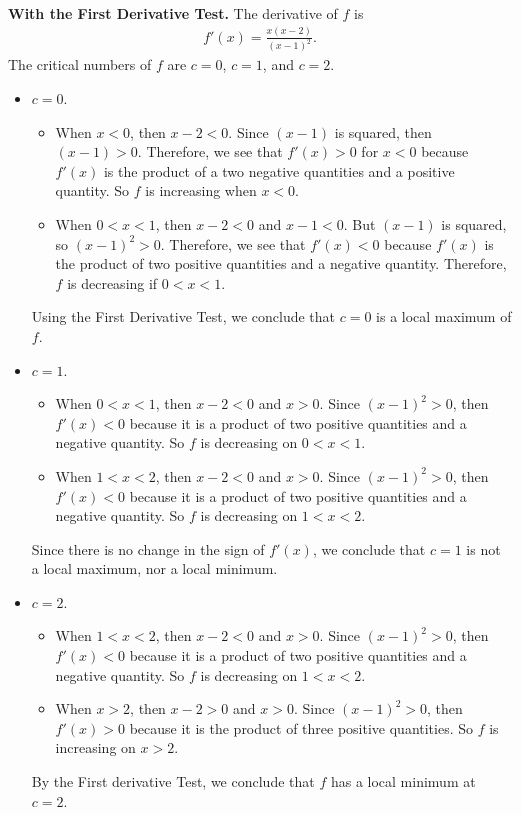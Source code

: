 	\spc
	
	\\
	\textbf{With the First Derivative Test.} The derivative of $f$ is
		\begin{align*}
		f'(x) = \frac{x(x - 2)}{(x - 1)^2} .
		\end{align*}
	The critical numbers of $f$ are $c = 0$, $c = 1$, and $ c= 2$.
	
		\begin{itemize}
		\item $c = 0$. 
			\begin{itemize}
			\item When $x < 0$, then $x - 2 < 0$. Since $(x - 1)$ is squared, then $(x - 1) > 0$. Therefore, we see that $f'(x) > 0$ for $x < 0$ because $f'(x)$ is the product of a two negative quantities and a positive quantity. So $f$ is increasing when $x < 0$.
			\item When $0 < x < 1$, then $x - 2 < 0$ and $x - 1 < 0$. But $(x - 1)$ is squared, so $(x- 1)^2 > 0$. Therefore, we see that $f'(x) < 0$ because $f'(x)$ is the product of two positive quantities and a negative quantity. Therefore, $f$ is decreasing if $0 < x < 1$. 
			\end{itemize}
		Using the First Derivative Test, we conclude that $c = 0$ is a local maximum of $f$.
	\item $c = 1$. 
		\begin{itemize}
		\item When $0 < x < 1$, then $x - 2 < 0$ and $x > 0$. Since $(x - 1)^2 > 0$, then $f'(x) < 0$ because it is a product of two positive quantities and a negative quantity. So $f$ is decreasing on $0 < x < 1$.
		\item When $1 < x < 2$, then $x - 2 < 0$ and $x > 0$. Since $(x - 1)^2 > 0$, then $f'(x) < 0$ because it is a product of two positive quantities and a negative quantity. So $f$ is decreasing on $1 < x < 2$. 
		\end{itemize}
		Since there is no change in the sign of $f'(x)$, we conclude that $c = 1$ is not a local maximum, nor a local minimum.
		\item $c = 2$. 
			\begin{itemize}
			\item When $1 < x < 2$, then $x - 2 < 0$ and $x > 0$. Since $(x - 1)^2 > 0$, then $f'(x) < 0$ because it is a product of two positive quantities and a negative quantity. So $f$ is decreasing on $1 < x < 2$. 
			\item When $x > 2$, then $x - 2 > 0$ and $x > 0$. Since $(x- 1)^2 > 0$, then $f'(x) > 0$ because it is the product of three positive quantities. So $f$ is increasing on $x > 2$.
			\end{itemize}
		By the First derivative Test, we conclude that $f$ has a local minimum at $c = 2$. 
		\end{itemize}
		
